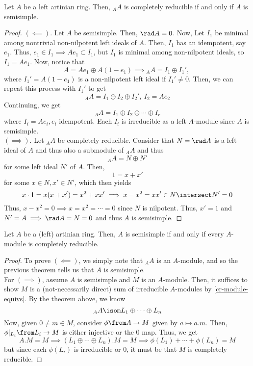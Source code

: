\documentclass[11pt,leqno,oneside]{amsbook}
\numberwithin{thm}{section}
\begin{document}
\begin{thm}
  Let \(A\) be a left artinian ring. Then, \({}_A A\) is completely
  reducible if and only if \(A\) is semisimple.
\end{thm}
\begin{proof}
  \((\impliedby).\) Let \(A\) be semisimple. Then, \(\rad A =
  0\). Now, Let \(I_1\) be minimal among nontrivial non-nilpotent left
  ideals of \(A\). Then, \(I_1\) has an idempotent, say \(e_1\). Thus,
  \(e_1 \in I_1 \implies Ae_1 \subset I_1\), but \(I_1\) is minimal
  among non-nilpotent ideals, so \(I_1 = Ae_1\). Now, notice that \[
    A = Ae_1 \oplus A(1-e_1) \implies {}_A A = I_1 \oplus I_1', \
  \]
   where \(I_1' = A(1-e_1)\) is a non-nilpotent left ideal if \(I_1'
   \neq 0\). Then, we can repeat this process with \(I_1'\) \todo{Why
     is \(I_1'\) minimal?} to get \[
     {}_A A = I_1 \oplus I_2 \oplus I_2', \ I_2 = Ae_2
   \]
    Continuing, we get \[
     {}_A A = I_1 \oplus I_2 \oplus \cdots \oplus I_r
   \]
   where \(I_i = Ae_i, e_i\) idempotent. Each \(I_i\) is irreducible
   as a left \(A\)-module since \(A\) is semisimple. \\

   \((\implies)\). Let \({}_A A\) be completely reducible. Consider
   that \(N = \rad A\) is a left ideal of \(A\) and thus also a
   submodule of \({}_A A\) and thus \[
     {}_A A = N \oplus N'
   \]
   for some left ideal \(N'\) of \(A\). Then, \[
     1 = x + x'
   \]
   for some \(x \in N, x' \in N'\), which then yields \[
     x \cdot 1 = x(x+x') = x^2 + xx' \implies x - x^2 = x x' \in N
     \intersect N' = 0
   \]
   Thus, \(x-x^2 = 0 \implies x = x^2 = \cdots = 0\) since \(N\) is
   nilpotent. Thus, \(x' = 1\) and \(N' = A \implies \rad A = N = 0\)
   and thus \(A\) is semisimple.
\end{proof}
\begin{thm}
  Let \(A\) be a (left) artinian ring. Then, \(A\) is semisimple if
  and only if every \(A\)-module is completely reducible.
\end{thm}
\begin{proof}
  To prove \((\impliedby)\), we simply note that \(_{A} A\) is an
  \(A\)-module, and so the previous theorem tells us that \(A\) is
  semisimple. \\

  For \((\implies)\), assume \(A\) is semisimple and \(M\) is an
  \(A\)-module. Then, it suffices to show \(M\) is a (not-necessarily
  direct) sum of irreducible \(A\)-modules by
  \ref{cr-module-equivs}. By the theorem above, we know \[
    {}_A A \isom L_1 \oplus \cdots \oplus L_n
  \]
  Now, given \(0 \neq m \in M\), consider \(\phi \from A \to M\) given
  by \(a \mapsto a.m\). Then, \(\phi|_{L_i} \from L_i \to M\) is
  either injective or the \(0\) map. Thus, we get \[
    A.M = M \implies (L_1 \oplus \cdots \oplus L_n).M = M \implies
    \phi(L_1) + \cdots + \phi(L_n) = M
  \]
  but since each \(\phi(L_i)\) is irreducible or \(0\), it must be
  that \(M\) is completely reducible.
\end{proof}
\end{document}
